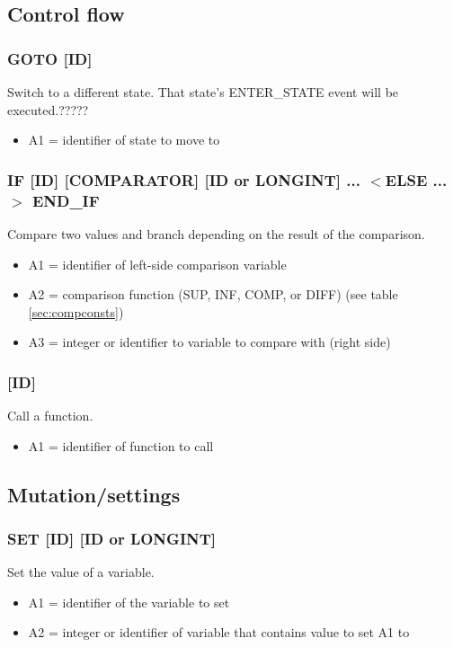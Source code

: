 \documentclass[12pt,a4paper]{scrbook}
\begin{document}
\subsection{Control flow}

\subsubsection{GOTO [ID]}
Switch to a different state.  That state's ENTER\_STATE event will be executed.?????
\begin{itemize}
\item A1 = identifier of state to move to
\end{itemize}

\subsubsection{IF [ID] [COMPARATOR] [ID or LONGINT] ... $<$ELSE ...$>$ END\_IF }
Compare two values and branch depending on the result of the comparison.
\begin{itemize}
\item A1 = identifier of left-side comparison variable
\item A2 = comparison function (SUP, INF, COMP, or DIFF) (see table \ref{sec:compconsts})
\item A3 = integer or identifier to variable to compare with (right side)
\end{itemize}

\subsubsection{[ID]}
Call a function.
\begin{itemize}
\item A1 = identifier of function to call
\end{itemize}


\subsection{Mutation/settings}

\subsubsection{SET [ID] [ID or LONGINT]}
Set the value of a variable.
\begin{itemize}
\item A1 = identifier of the variable to set
\item A2 = integer or identifier of variable that contains value to set A1 to
\end{itemize}
\end{document}
